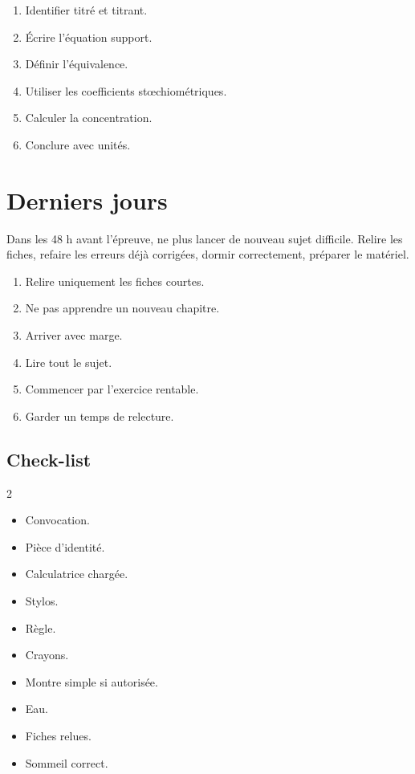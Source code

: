 \documentclass[11pt,a4paper]{article}
\newcommand{\checkbox}{\ding{113}}
\begin{document}
\begin{methode}
\begin{enumerate}
  \item Identifier titré et titrant.
  \item Écrire l'équation support.
  \item Définir l'équivalence.
  \item Utiliser les coefficients stœchiométriques.
  \item Calculer la concentration.
  \item Conclure avec unités.
\end{enumerate}
\end{methode}

\section{Derniers jours}

\begin{alerte}
Dans les 48 h avant l'épreuve, ne plus lancer de nouveau sujet difficile. Relire les fiches, refaire les erreurs déjà corrigées, dormir correctement, préparer le matériel.
\end{alerte}

\begin{methode}
\begin{enumerate}
  \item Relire uniquement les fiches courtes.
  \item Ne pas apprendre un nouveau chapitre.
  \item Arriver avec marge.
  \item Lire tout le sujet.
  \item Commencer par l'exercice rentable.
  \item Garder un temps de relecture.
\end{enumerate}
\end{methode}

\subsection*{Check-list}
\begin{multicols}{2}
\begin{itemize}
  \item[\checkbox] Convocation.
  \item[\checkbox] Pièce d'identité.
  \item[\checkbox] Calculatrice chargée.
  \item[\checkbox] Stylos.
  \item[\checkbox] Règle.
  \item[\checkbox] Crayons.
  \item[\checkbox] Montre simple si autorisée.
  \item[\checkbox] Eau.
  \item[\checkbox] Fiches relues.
  \item[\checkbox] Sommeil correct.
\end{itemize}
\end{multicols}
\end{document}
